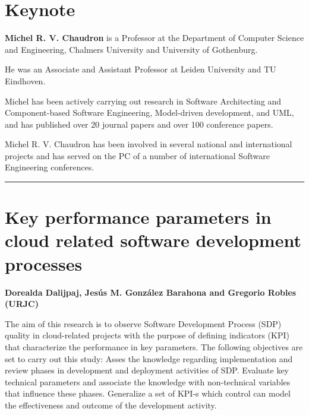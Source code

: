 \documentclass[11pt,pressrelease]{newlfm} %
\begin{document}
\begin{newlfm}



\section{Keynote}

{\bf Michel R. V. Chaudron} is a Professor at the Department of Computer Science and Engineering, Chalmers University and University of Gothenburg.

He was an Associate and Assistant Professor at Leiden University and TU Eindhoven.

Michel has been actively carrying out research in Software Architecting and Component-based Software Engineering, Model-driven development, and UML, and has published over 20 journal papers and over 100 conference papers.

Michel R. V. Chaudron has been involved in several national and international projects and has served on the PC of a number of international Software Engineering conferences.

\rule{\textwidth}{1pt} \par \noindent
\section{Key performance parameters in cloud related software development processes}

{\bf Dorealda Dalijpaj, Jes\'us M. Gonz\'alez Barahona and Gregorio Robles (URJC)}


The aim of this research is to observe Software Development Process (SDP) quality in cloud-related projects with the purpose of defining indicators (KPI) that characterize the performance in key parameters. 
The following objectives are set to carry out this study: 
Asses the knowledge regarding implementation and review phases in development and deployment activities of SDP.
Evaluate key technical parameters and associate the knowledge with non-technical variables that influence these phases.
Generalize a set of KPI-s which control can model the effectiveness and outcome of the development activity.


\end{newlfm}
\end{document}
